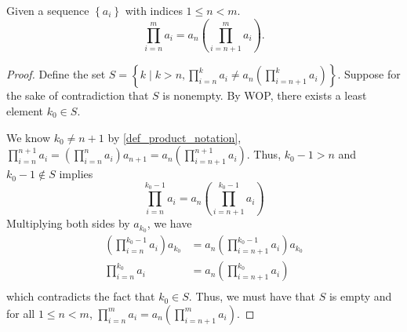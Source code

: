 \begin{lemma}\label{prod_split_from_start}
    Given a sequence $\left\{ a_i \right\}$ with indices $1\leq n<m$.
    \begin{equation*}
        \prod_{i=n}^m a_i = a_{n} (\prod_{i=n+1}^m a_i).
    \end{equation*}
\end{lemma}
\begin{proof}
    Define the set $S=\left\{ k\mid k>n, \prod_{i=n}^k a_i \neq a_n \left( \prod_{i=n+1}^k a_i \right) \right\}$. Suppose for the sake of contradiction that $S$ is nonempty. By WOP, there exists a least element $k_0\in S$. 

    We know $k_0\neq n+1$ by \ref{def_product_notation}, $\prod_{i=n}^{n+1} a_i=\left(\prod_{i=n}^n a_i\right) a_{n+1}=a_n \left(\prod_{i=n+1}^{n+1} a_i\right) $. Thus, $k_0-1>n$ and $k_0-1 \not\in S$ implies
    \begin{equation*}
        \prod_{i=n}^{k_0-1} a_i = a_n \left(\prod_{i=n+1}^{k_0-1} a_i\right)
    \end{equation*}
    Multiplying both sides by $a_{k_0}$, we have
    \begin{equation*}
        \begin{aligned}
            \left( \prod_{i=n}^{k_0-1} a_i \right) a_{k_0}&= a_n \left( \prod_{i=n+1}^{k_0-1} a_i \right) a_{k_0}\\
            \prod_{i=n}^{k_0} a_i &= a_n \left( \prod_{i=n+1}^{k_0} a_i \right)\\
        \end{aligned}
    \end{equation*}
    which contradicts the fact that $k_0 \in S$. Thus, we must have that $S$ is empty and for all $1\leq n<m$, $\prod_{i=n}^m a_i = a_{n} \left(\prod_{i=n+1}^m a_i \right)$.
\end{proof}

